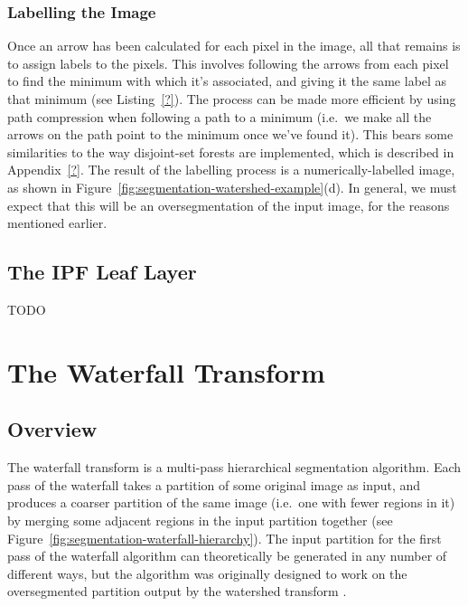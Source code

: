 \subsubsection{Labelling the Image}

Once an arrow has been calculated for each pixel in the image, all that remains is to assign labels to the pixels. This involves following the arrows from each pixel to find the minimum with which it's associated, and giving it the same label as that minimum (see Listing~\ref{?}). The process can be made more efficient by using path compression when following a path to a minimum (i.e.~we make all the arrows on the path point to the minimum once we've found it). This bears some similarities to the way disjoint-set forests are implemented, which is described in Appendix~\ref{?}. The result of the labelling process is a numerically-labelled image, as shown in Figure~\ref{fig:segmentation-watershed-example}(d). In general, we must expect that this will be an oversegmentation of the input image, for the reasons mentioned earlier.

\subsection{The IPF Leaf Layer}

TODO

\section{The Waterfall Transform}

\subsection{Overview}

The waterfall transform is a multi-pass hierarchical segmentation algorithm. Each pass of the waterfall takes a partition of some original image as input, and produces a coarser partition of the same image (i.e.~one with fewer regions in it) by merging some adjacent regions in the input partition together (see Figure~\ref{fig:segmentation-waterfall-hierarchy}). The input partition for the first pass of the waterfall algorithm can theoretically be generated in any number of different ways, but the algorithm was originally designed to work on the oversegmented partition output by the watershed transform \cite{marcotegui05}.


